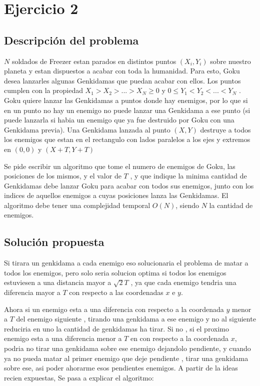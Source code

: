 
\section{Ejercicio 2}
    \subsection{Descripción del problema}
        $N$ soldados de Freezer estan parados en distintos puntos $(X_i,Y_i)$ sobre nuestro planeta y estan dispuestos a acabar con toda la humanidad. Para esto, Goku desea lanzarles algunas Genkidamas que puedan acabar con ellos. Los puntos cumplen con la propiedad $ X_1 > X_2 >. . . > X_N \geq 0 $ y $ 0 \leq Y_1 < Y_2 < . . . < Y_N$ . Goku quiere lanzar las Genkidamas a puntos donde hay enemigos, por lo que si en un punto no hay un enemigo no puede lanzar una Genkidama a ese punto (si puede lanzarla si habia un enemigo que ya fue destruido por Goku con una Genkidama previa). Una Genkidama lanzada al punto $(X,Y)$ destruye a todos los enemigos que estan en el rectangulo con lados paralelos a los ejes y extremos en $(0, 0)$ y $(X + T, Y + T )$

        Se pide escribir un algoritmo que tome el numero de enemigos de Goku, las posiciones de los mismos, y el valor de $T$ , y que indique la minima cantidad de Genkidamas debe lanzar Goku para acabar con todos sus enemigos, junto con los  indices de aquellos enemigos a cuyas posiciones lanza las Genkidamas. El algoritmo debe tener una complejidad temporal $O(N)$, siendo $N$ la cantidad de enemigos.

    \subsection{Solución propuesta}
        Si tirara un genkidama a cada enemigo eso solucionaria el problema de matar a todos los enemigos, pero solo seria solucion optima si todos los enemigos estuviesen a una distancia mayor a $\sqrt{2}T$ , ya que cada enemigo tendria una diferencia mayor a $T$ con respecto a las coordenadas $x$ e $y$. 

        Ahora si un enemigo esta a una diferencia con respecto a la coordenada $y$ menor a $T$ del enemigo siguiente , tirando una genkidama a ese enemigo y no al siguiente reduciria en uno la cantidad de genkidamas ha tirar. Si no , si el proximo enemigo esta a una diferencia menor a $T$ en con respecto a la coordenada $x$, podria no tirar una genkidama sobre ese enemigo dejandolo pendiente, y cuando ya no pueda matar al primer enemigo que deje pendiente , tirar una genkidama sobre ese, asi poder ahorarme esos pendientes enemigos. A partir de la ideas recien expuestas, Se pasa a explicar el algoritmo:  



